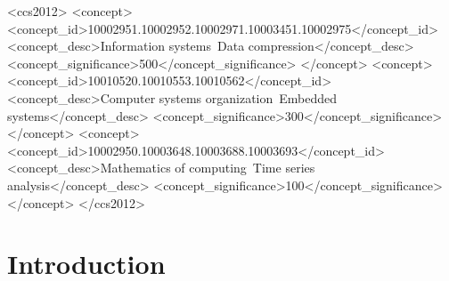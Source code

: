 \documentclass[acmlarge]{acmart}
\begin{document}

\begin{CCSXML}
<ccs2012>
 <concept>
  <concept_id>10002951.10002952.10002971.10003451.10002975</concept_id>
  <concept_desc>Information systems~Data compression</concept_desc>
  <concept_significance>500</concept_significance>
 </concept>
 <concept>
  <concept_id>10010520.10010553.10010562</concept_id>
  <concept_desc>Computer systems organization~Embedded systems</concept_desc>
  <concept_significance>300</concept_significance>
 </concept>
 <concept>
  <concept_id>10002950.10003648.10003688.10003693</concept_id>
  <concept_desc>Mathematics of computing~Time series analysis</concept_desc>
  <concept_significance>100</concept_significance>
 </concept>
</ccs2012>
\end{CCSXML}



\maketitle

\renewcommand{\shortauthors}{D. Blalock et al.}

\section{Introduction} \label{sec:intro}




% 

\vspace{3mm}
\end{document}
